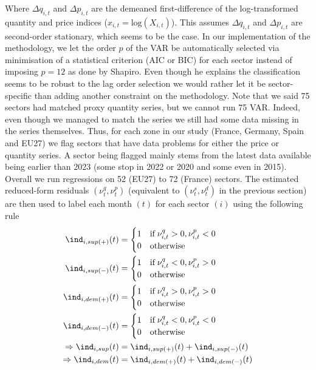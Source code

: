 Where $\Delta q_{i,t}$ and $\Delta p_{i,t}$ are the demeaned first-difference of the log-transformed quantity and price indices ($x_{i,t} = \textrm{log}(X_{i,t})$).
This assumes $\Delta q_{i,t}$ and $\Delta p_{i,t}$ are second-order stationary, which seems to be the case. 
\bigbreak
In our implementation of the methodology, we let the order $p$ of the VAR be automatically selected via minimisation of a statistical criterion (AIC or BIC) for each sector instead of imposing $p=12$ as done by Shapiro.
Even though he explains the classification seems to be robust to the lag order selection we would rather let it be sector-specific than adding another constraint on the methodology.
\bigbreak
Note that we said 75 sectors had matched proxy quantity series, but we cannot run 75 VAR. Indeed, even though we managed to match the series we still had some data missing in the series themselves.
Thus, for each zone in our study (France, Germany, Spain and EU27) we flag sectors that have data problems for either the price or quantity series. A sector being flagged mainly stems from the latest data available being earlier than 2023 (some stop in 2022 or 2020 and some even in 2015).
Overall we run regressions on 52 (EU27) to 72 (France) sectors.
\bigbreak
The estimated reduced-form residuals $(\nu_{t}^{q},\nu_{t}^{p})$ (equivalent to $(\nu_{t}^{s},\nu_{t}^{d})$ in the previous section) are then used to label each month $(t)$ for each sector $(i)$ using the following rule
\begin{align*}
    \ind_{i,sup(+)}(t) &= \begin{cases} 1 \quad \textrm{if} \; \nu_{i,t}^{q}>0,\nu_{i,t}^{p}<0 \\ 0 \quad \textrm{otherwise} \end{cases} \\
    \ind_{i,sup(-)}(t) &= \begin{cases} 1 \quad \textrm{if} \; \nu_{i,t}^{q}<0,\nu_{i,t}^{p}>0 \\ 0 \quad \textrm{otherwise} \end{cases} \\
    \ind_{i,dem(+)}(t) &= \begin{cases} 1 \quad \textrm{if} \; \nu_{i,t}^{q}>0,\nu_{i,t}^{p}>0 \\ 0 \quad \textrm{otherwise} \end{cases} \\
    \ind_{i,dem(-)}(t) &= \begin{cases} 1 \quad \textrm{if} \; \nu_{i,t}^{q}<0,\nu_{i,t}^{p}<0 \\ 0 \quad \textrm{otherwise} \end{cases} \\
    \Rightarrow \ind_{i,sup}(t) &= \ind_{i,sup(+)}(t) + \ind_{i,sup(-)}(t) \\
    \Rightarrow \ind_{i,dem}(t) &= \ind_{i,dem(+)}(t) + \ind_{i,dem(-)}(t) \\
\end{align*}

